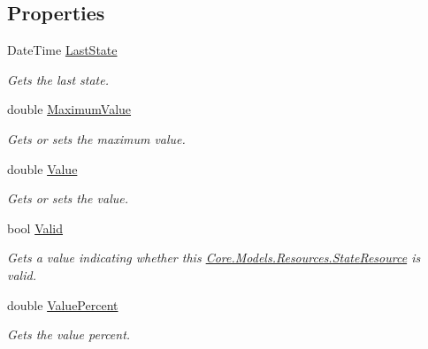 \subsection*{Properties}
\begin{DoxyCompactItemize}
\item 
Date\+Time \hyperlink{classCore_1_1Models_1_1Resources_1_1StateResource_a75487d3e4a4fc0d6ccad2ca36a71e113}{Last\+State}
\begin{DoxyCompactList}\small\item\em Gets the last state. \end{DoxyCompactList}\item 
double \hyperlink{classCore_1_1Models_1_1Resources_1_1StateResource_a2514d486f4dfd8e5dadf49035d99b84e}{Maximum\+Value}
\begin{DoxyCompactList}\small\item\em Gets or sets the maximum value. \end{DoxyCompactList}\item 
double \hyperlink{classCore_1_1Models_1_1Resources_1_1StateResource_a5c76991dca189e22972d84c8a7809436}{Value}
\begin{DoxyCompactList}\small\item\em Gets or sets the value. \end{DoxyCompactList}\item 
bool \hyperlink{classCore_1_1Models_1_1Resources_1_1StateResource_aeae95bd23d41b66b1c88aab78860b9d6}{Valid}
\begin{DoxyCompactList}\small\item\em Gets a value indicating whether this \hyperlink{classCore_1_1Models_1_1Resources_1_1StateResource}{Core.\+Models.\+Resources.\+State\+Resource} is valid. \end{DoxyCompactList}\item 
double \hyperlink{classCore_1_1Models_1_1Resources_1_1StateResource_a375bb8b4d96a0a0e0e3512185b1a2346}{Value\+Percent}
\begin{DoxyCompactList}\small\item\em Gets the value percent. \end{DoxyCompactList}\end{DoxyCompactItemize}


